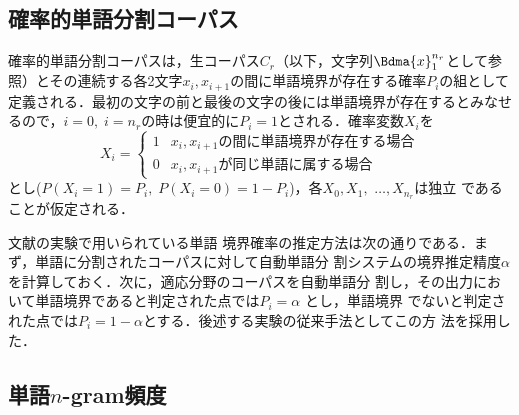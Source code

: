 \documentclass[japanese]{jnlp_1.4}
\begin{document}
\subsection{確率的単語分割コーパス}

\label{subsection:EM}

確率的単語分割コーパスは，生コーパス$C_{r}$（以下，文字列$\Bdma{x}_1^{n_{r}}$として参
照）とその連続する各2文字$x_{i},x_{i+1}$の間に単語境界が存在する確率$P_{i}$の組として
定義される．最初の文字の前と最後の文字の後には単語境界が存在するとみなせるので，$i =
0,\; i = n_{r}$の時は便宜的に$P_{i} = 1$とされる．確率変数$X_{i}$を
\[
X_{i} = \left\{
  \begin{array}{rl}
    1 & \mbox{$x_{i},x_{i+1}$の間に単語境界が存在する場合} \\
    0 & \mbox{$x_{i},x_{i+1}$が同じ単語に属する場合}
  \end{array} \right.
\]
とし($P(X_{i}=1) = P_{i},\;P(X_{i}=0) = 1-P_{i}$)，各$X_0,X_1,$ $\dots,X_{n_r}$は独立
であることが仮定される．

文献\cite{確率的単語分割コーパスからの単語N-gram確率の計算}の実験で用いられている単語
境界確率の推定方法は次の通りである．まず，単語に分割されたコーパスに対して自動単語分
割システムの境界推定精度$\alpha$を計算しておく．次に，適応分野のコーパスを自動単語分
割し，その出力において単語境界であると判定された点では$P_{i} = \alpha$ とし，単語境界
でないと判定された点では$P_{i} = 1-\alpha$とする．後述する実験の従来手法としてこの方
法を採用した．




\subsection{単語$n$-gram頻度}

\label{subsection:EF}
\end{document}
